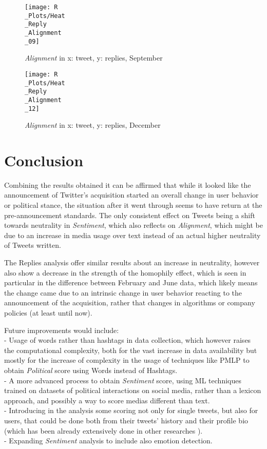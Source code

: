 \documentclass[twoside,twocolumn]{article}
\begin{document}
	\begin{figure}
		\texttt{[image: R\\\_Plots/Heat\\\_Reply\\\_Alignment\\\_09]}
		\caption{\textit{Alignment} in x: tweet, y: replies, September}\label{fig:R_Heat_Reply_Alignment_09}
	\end{figure}
	\begin{figure}
		\texttt{[image: R\\\_Plots/Heat\\\_Reply\\\_Alignment\\\_12]}
		\caption{\textit{Alignment} in x: tweet, y: replies, December}\label{fig:R_Heat_Reply_Alignment_12}
	\end{figure}

	
	\section{Conclusion}
	Combining the results obtained it can be affirmed that while it looked like the announcement of Twitter's acquisition started an overall change in user behavior or political stance, the situation after it went through seems to have return at the pre-announcement standards. The only consistent effect on Tweets being a shift towards neutrality in \textit{Sentiment}, which also reflects on \textit{Alignment}, which might be due to an increase in media usage over text instead of an actual higher neutrality of Tweets written.
	
	The Replies analysis offer similar results about an increase in neutrality, however also show a decrease in the strength of the homophily effect, which is seen in particular in the difference between February and June data, which likely means the change came due to an intrinsic change in user behavior reacting to the announcement of the acquisition, rather that changes in algorithms or company policies (at least until now).
	
	Future improvements would include:\\
	- Usage of words rather than hashtags in data collection, which however raises the computational complexity, both for the vast increase in data availability but mostly for the increase of complexity in the usage of techniques like PMLP to obtain \textit{Political} score using Words instead of Hashtags.\\
	- A more advanced process to obtain \textit{Sentiment} score, using ML techniques trained on datasets of political interactions on social media, rather than a lexicon approach, and possibly a way to score medias different than text.\\
	- Introducing in the analysis some scoring not only for single tweets, but also for users, that could be done both from their tweets' history and their profile bio (which has been already extensively done in other researches \cite{Bio}).\\
	- Expanding \textit{Sentiment} analysis to include also emotion detection.
	
\end{document}
